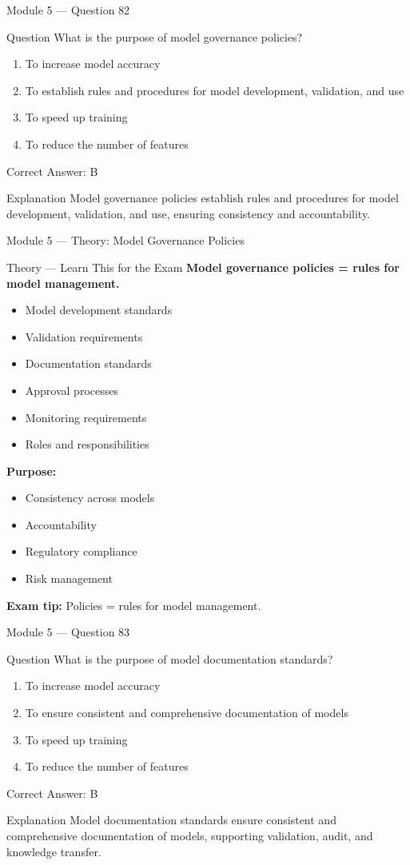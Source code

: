 \documentclass[aspectratio=169,10pt]{beamer}
\newcommand{\question}[1]{%
	\begin{block}{Question}
		#1
	\end{block}
}
\newcommand{\options}[4]{%
	\begin{enumerate}[label=\Alph*.,leftmargin=*]
		\item #1
		\item #2
		\item #3
		\item #4
	\end{enumerate}
}
\newcommand{\answerbox}[1]{%
	\begin{exampleblock}{Correct Answer: #1}
	\end{exampleblock}
}
\newcommand{\explain}[1]{%
	\begin{block}{Explanation}
		\small #1
	\end{block}
}
\newcommand{\theory}[1]{%
	\begin{block}{Theory --- Learn This for the Exam}
		\small #1
	\end{block}
}
\begin{document}
	\begin{frame}{Module 5 --- Question 82}
		\question{What is the purpose of model governance policies?}
		\options{To increase model accuracy}{To establish rules and procedures for model development, validation, and use}{To speed up training}{To reduce the number of features}
		\answerbox{B}
		\explain{Model governance policies establish rules and procedures for model development, validation, and use, ensuring consistency and accountability.}
	\end{frame}
	
	\begin{frame}{Module 5 --- Theory: Model Governance Policies}
		\theory{
			\textbf{Model governance policies = rules for model management.}
			\begin{itemize}
				\item Model development standards
				\item Validation requirements
				\item Documentation standards
				\item Approval processes
				\item Monitoring requirements
				\item Roles and responsibilities
			\end{itemize}
			\textbf{Purpose:}
			\begin{itemize}
				\item Consistency across models
				\item Accountability
				\item Regulatory compliance
				\item Risk management
			\end{itemize}
			\textbf{Exam tip:} Policies = rules for model management.
		}
	\end{frame}
	
	\begin{frame}{Module 5 --- Question 83}
		\question{What is the purpose of model documentation standards?}
		\options{To increase model accuracy}{To ensure consistent and comprehensive documentation of models}{To speed up training}{To reduce the number of features}
		\answerbox{B}
		\explain{Model documentation standards ensure consistent and comprehensive documentation of models, supporting validation, audit, and knowledge transfer.}
	\end{frame}
	
\end{document}
